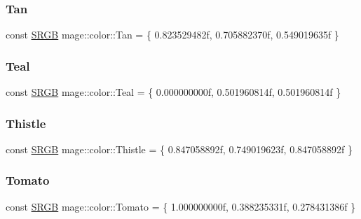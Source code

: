 \hypertarget{namespacemage_1_1color_a40a0a3dbf5b5ac7ac3c8076421be4d24}{}\label{namespacemage_1_1color_a40a0a3dbf5b5ac7ac3c8076421be4d24} 
\subsubsection{\texorpdfstring{Tan}{Tan}}
{\footnotesize\ttfamily const \hyperlink{structmage_1_1_s_r_g_b}{S\+R\+GB} mage\+::color\+::\+Tan = \{ 0.\+823529482f, 0.\+705882370f, 0.\+549019635f \}}

\hypertarget{namespacemage_1_1color_af0c217891f8246831303f03225363442}{}\label{namespacemage_1_1color_af0c217891f8246831303f03225363442} 
\subsubsection{\texorpdfstring{Teal}{Teal}}
{\footnotesize\ttfamily const \hyperlink{structmage_1_1_s_r_g_b}{S\+R\+GB} mage\+::color\+::\+Teal = \{ 0.\+000000000f, 0.\+501960814f, 0.\+501960814f \}}

\hypertarget{namespacemage_1_1color_a289ed514f534f753649634853d8645bb}{}\label{namespacemage_1_1color_a289ed514f534f753649634853d8645bb} 
\subsubsection{\texorpdfstring{Thistle}{Thistle}}
{\footnotesize\ttfamily const \hyperlink{structmage_1_1_s_r_g_b}{S\+R\+GB} mage\+::color\+::\+Thistle = \{ 0.\+847058892f, 0.\+749019623f, 0.\+847058892f \}}

\hypertarget{namespacemage_1_1color_aee8bb388f326f18533838abdb2ac2b51}{}\label{namespacemage_1_1color_aee8bb388f326f18533838abdb2ac2b51} 
\subsubsection{\texorpdfstring{Tomato}{Tomato}}
{\footnotesize\ttfamily const \hyperlink{structmage_1_1_s_r_g_b}{S\+R\+GB} mage\+::color\+::\+Tomato = \{ 1.\+000000000f, 0.\+388235331f, 0.\+278431386f \}}

\hypertarget{namespacemage_1_1color_a075d778d7eabdd7d54b623e6a7254fc8}{}\label{namespacemage_1_1color_a075d778d7eabdd7d54b623e6a7254fc8} 
